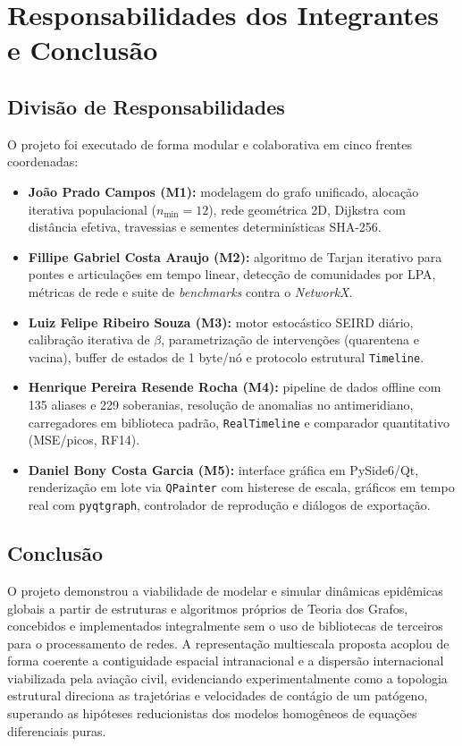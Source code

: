 \documentclass[11pt]{article}
\begin{document}
\section{Responsabilidades dos Integrantes e Conclusão} \label{sec:conclusao}

\subsection{Divisão de Responsabilidades}

O projeto foi executado de forma modular e colaborativa em cinco frentes coordenadas:

\begin{itemize}
  \item \textbf{João Prado Campos (M1):} modelagem do grafo unificado, alocação iterativa populacional ($n_{\min} = 12$), rede geométrica 2D, Dijkstra com distância efetiva, travessias e sementes determinísticas SHA-256.
  \item \textbf{Fillipe Gabriel Costa Araujo (M2):} algoritmo de Tarjan iterativo para pontes e articulações em tempo linear, detecção de comunidades por LPA, métricas de rede e suite de \emph{benchmarks} contra o \emph{NetworkX}.
  \item \textbf{Luiz Felipe Ribeiro Souza (M3):} motor estocástico SEIRD diário, calibração iterativa de $\beta$, parametrização de intervenções (quarentena e vacina), buffer de estados de 1 byte/nó e protocolo estrutural \texttt{Timeline}.
  \item \textbf{Henrique Pereira Resende Rocha (M4):} pipeline de dados offline com 135 aliases e 229 soberanias, resolução de anomalias no antimeridiano, carregadores em biblioteca padrão, \texttt{RealTimeline} e comparador quantitativo (MSE/picos, RF14).
  \item \textbf{Daniel Bony Costa Garcia (M5):} interface gráfica em PySide6/Qt, renderização em lote via \texttt{QPainter} com histerese de escala, gráficos em tempo real com \texttt{pyqtgraph}, controlador de reprodução e diálogos de exportação.
\end{itemize}

\subsection{Conclusão}

O projeto demonstrou a viabilidade de modelar e simular dinâmicas epidêmicas globais a partir de estruturas e algoritmos próprios de Teoria dos Grafos, concebidos e implementados integralmente sem o uso de bibliotecas de terceiros para o processamento de redes. A representação multiescala proposta acoplou de forma coerente a contiguidade espacial intranacional e a dispersão internacional viabilizada pela aviação civil, evidenciando experimentalmente como a topologia estrutural direciona as trajetórias e velocidades de contágio de um patógeno, superando as hipóteses reducionistas dos modelos homogêneos de equações diferenciais puras.
\end{document}
